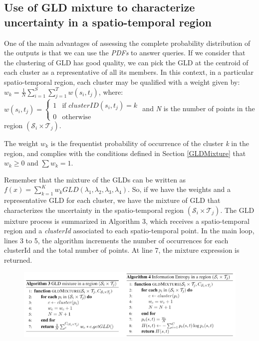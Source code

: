 \documentclass[11pt]{article}
\begin{document}
\subsection{Use of GLD mixture to characterize uncertainty in a spatio-temporal region}
\label{sub:gldMixtureWorkflow}
One of the main advantages of assessing the complete probability distribution of the outputs is that we can use the \textit{PDFs} to answer queries. If we consider that the clustering of GLD has good quality, we can pick the GLD at the centroid of each cluster as a representative of all its members. In this context, in a particular spatio-temporal region, each cluster may be qualified with a weight given by:$ w_{k}=\frac{1}{N}\sum_{i=1}^S \sum_{j=1}^T w(s_{i},t_{j})$, where: $w(s_{i},t_{j}) =
  \begin{cases}
    1 & \text{if $clusterID(s_{i},t_{j}) = k$} \\
    0 & \text{otherwise}
  \end{cases}$ and  \textit{N} is the number of points in the region $(\mathcal{S}_{i} \times \mathcal{T}_{j})$.

The weight $w_k$ is the frequentist probability of occurrence of the cluster \textit{k} in the region, and complies with the conditions defined in Section \ref{GLDMixture} that $w_{k} \geq 0$ and $\sum w_{k}=1$.

Remember that the mixture of the GLDs can be written as $f(x)=\sum_{k=1}^K w_{k}GLD(\lambda_{1},\lambda_{2},\lambda_{3},\lambda_{4})$. So, if we have the weights and a representative GLD for each cluster, we have the mixture of GLD that characterizes the uncertainty in the spatio-temporal region $(\mathcal{S}_{i} \times \mathcal{T}_{j})$. The GLD mixture process is summarized in 
Algorithm 3, which receives  a spatio-temporal region and a \textit{clusterId}  associated to each spatio-temporal point. In the main loop, lines 3 to 5, the algorithm increments the number of occurrences for each clusterId and the total number of points. At line 7, the mixture expression is returned.


\begin{figure}
\vspace{-2cm}
    \centering
    \includegraphics{figs/Algorithms_3_4.png}
\end{figure}
\end{document}
